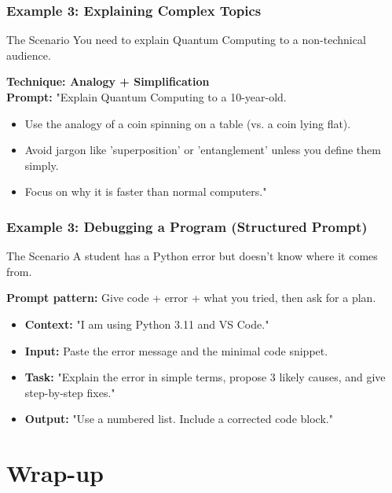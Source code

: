 \documentclass{beamer}
\begin{document}
\begin{frame}
    \frametitle{Example 3: Explaining Complex Topics}
    \begin{block}{The Scenario}
        You need to explain Quantum Computing to a non-technical audience.
    \end{block}
    \textbf{Technique: Analogy + Simplification} \\
    \vspace{0.5cm}
    \textbf{Prompt:}
    "Explain Quantum Computing to a 10-year-old.
    \begin{itemize}
        \item Use the analogy of a coin spinning on a table (vs. a coin lying flat).
        \item Avoid jargon like 'superposition' or 'entanglement' unless you define them simply.
        \item Focus on why it is faster than normal computers."
    \end{itemize}
\end{frame}

\begin{frame}
    \frametitle{Example 3: Debugging a Program (Structured Prompt)}
    \begin{block}{The Scenario}
        A student has a Python error but doesn't know where it comes from.
    \end{block}
        \textbf{Prompt pattern:} Give code + error + what you tried, then ask for a plan.\\
    \vspace{0.3cm}
    \begin{itemize}
        \item \textbf{Context:} "I am using Python 3.11 and VS Code."
        \item \textbf{Input:} Paste the error message and the minimal code snippet.
        \item \textbf{Task:} "Explain the error in simple terms, propose 3 likely causes, and give step-by-step fixes."
        \item \textbf{Output:} "Use a numbered list. Include a corrected code block." 
    \end{itemize}
\end{frame}

\section{Wrap-up}
\end{document}
